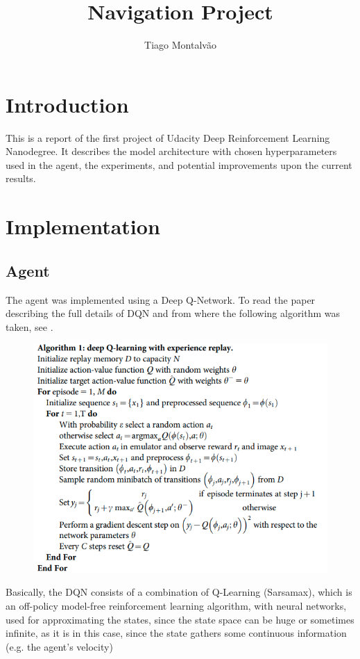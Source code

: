 \documentclass{article}
\title{Navigation Project}
\author{Tiago Montalvão}
\begin{document}
\maketitle
\justify

\section{Introduction}

This is a report of the first project of Udacity Deep Reinforcement Learning Nanodegree. It describes the model architecture with chosen hyperparameters used in the agent, the experiments, and potential improvements upon the current results.

\section{Implementation}
\subsection{Agent}

The agent was implemented using a Deep Q-Network. To read the paper describing the full details of DQN and from where the following algorithm was taken, see \cite{Mnih2015}.

\begin{figure}[H]
\centering
\includegraphics[scale=0.5]{img/DQN.png}
\label{fig:dqn}
\end{figure}

Basically, the DQN consists of a combination of Q-Learning (Sarsamax), which is an off-policy model-free reinforcement learning algorithm, with neural networks, used for approximating the states, since the state space can be huge or sometimes infinite, as it is in this case, since the state gathers some continuous information (e.g. the agent's velocity)
\end{document}
